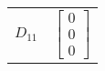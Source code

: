 \begin{tabular}{cl}
 $D_{11}$ & $\left[\begin{matrix}0\\0\\0\end{matrix}\right]$                                                                                                                                                                                                                                                                                                                                                                                                                                                                                                                                                                                                                                                                                                                                                                                                                                                                                                                                                                                                                                                                                                                                                                                                                                                                                                                                                                                                                                                                                                                                                                                                                                                                                                                                                                                                                                                                                                                                                                                                                                                                                                                                                                                                                                                                                                                                                                                                                                                                                                                                                                                                                                                                                                                                                                                                                                                                                                                                                                                                                                                                                                                                                                        
\end{tabular}
